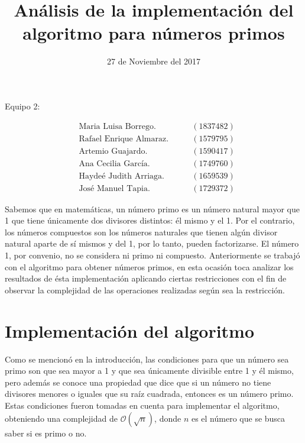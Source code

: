 

\author{
}
\date{
27 de Noviembre del 2017
}
\title{An\'alisis de la implementaci\'on del algoritmo para n\'umeros primos}


\maketitle
\begin{center}
Equipo 2:
\end{center}
\begin{align*}
	&\textrm{Maria Luisa Borrego.} 					\qquad &(1837482)\\
	&\textrm{Rafael Enrique Almaraz.}				\qquad &(1579795)\\
	&\textrm{Artemio Guajardo.} 					\qquad &(1590417)\\
	&\textrm{Ana Cecilia Garc\'ia.}					\qquad &(1749760)\\
	&\textrm{Hayde\'e Judith Arriaga.}				\qquad &(1659539)\\
	&\textrm{Jos\'e Manuel Tapia.}					\qquad &(1729372)
\end{align*}


Sabemos que en matem\'aticas, un n\'umero primo es un n\'umero natural mayor que 1 que tiene \'unicamente dos divisores distintos: \'el mismo y el 1. Por el contrario, los n\'umeros compuestos son los n\'umeros naturales que tienen alg\'un divisor natural aparte de s\'i mismos y del 1, por lo tanto, pueden factorizarse. El n\'umero 1, por convenio, no se considera ni primo ni compuesto. Anteriormente se trabaj\'o con el algoritmo para obtener n\'umeros primos, en esta ocasi\'on toca analizar los resultados de \'esta implementaci\'on aplicando ciertas restricciones con el fin de observar la complejidad de las operaciones realizadas seg\'un sea la restricci\'on.

\section{Implementaci\'on del algoritmo}



Como se mencion\'o en la introducci\'on, las condiciones para que un n\'umero sea primo son que sea mayor a 1 y que sea \'unicamente divisible entre 1 y \'el mismo, pero adem\'as se conoce una propiedad que dice que si un n\'umero no tiene divisores menores o iguales que su ra\'iz cuadrada, entonces es un n\'umero primo. Estas condiciones fueron tomadas en cuenta para implementar el algoritmo, obteniendo una complejidad de $\mathcal{O}(\sqrt{n})$, donde $n$ es el n\'umero que se busca saber si es primo o no.

